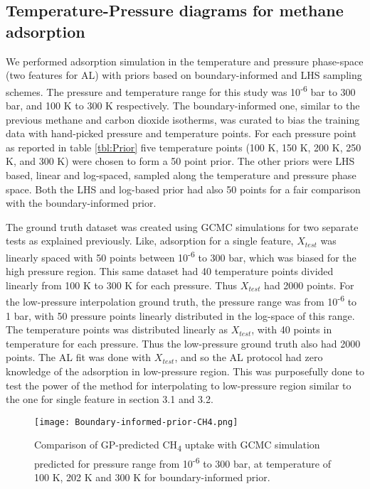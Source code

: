 \documentclass[twoside,twocolumn,9pt]{article}
\begin{document}
\subsection{Temperature-Pressure diagrams for methane adsorption}

We performed adsorption simulation in the temperature and pressure phase-space (two features for AL) with priors based on boundary-informed and LHS sampling schemes. The pressure and temperature range for this study was 10\textsuperscript{-6} bar to 300 bar, and 100 K to 300 K respectively. The boundary-informed one, similar to the previous methane and carbon dioxide isotherms, was curated to bias the training data with hand-picked pressure and temperature points. For each pressure point as reported in table \ref{tbl:Prior} five temperature points (100 K, 150 K, 200 K, 250 K, and 300 K) were chosen to form a 50 point prior. The other priors were LHS based, linear and log-spaced, sampled along the temperature and pressure phase space. Both the LHS and log-based prior had also 50 points for a fair comparison with the boundary-informed prior.

The ground truth dataset was created using GCMC simulations for two separate tests as explained previously. Like, adsorption for a single feature, $X_{test}$ was linearly spaced with 50 points between 10\textsuperscript{-6} to 300 bar, which was biased for the high pressure region. This same dataset had 40 temperature points divided linearly from 100 K to 300 K for each pressure. Thus $X_{test}$ had 2000 points. For the low-pressure interpolation ground truth, the pressure range was from 10\textsuperscript{-6} to 1 bar, with 50 pressure points linearly distributed in the log-space of this range. The temperature points was distributed linearly as $X_{test}$, with 40 points in temperature for each pressure. Thus the low-pressure ground truth also had 2000 points. The AL fit was done with $X_{test}$, and so the AL protocol had zero knowledge of the adsorption in low-pressure region. This was purposefully done to test the power of the method for interpolating to low-pressure region similar to the one for single feature in section 3.1 and 3.2.

\begin{figure}[ht]
\centering
  \texttt{[image: Boundary-informed-prior-CH4.png]}
  \caption{Comparison of GP-predicted CH\textsubscript{4} uptake with GCMC simulation predicted for pressure range from 10\textsuperscript{-6} to 300 bar, at temperature of 100 K, 202 K and 300 K for boundary-informed prior.}
  \label{fgr:boundary_ch4_uptake}
\end{figure}
\end{document}
